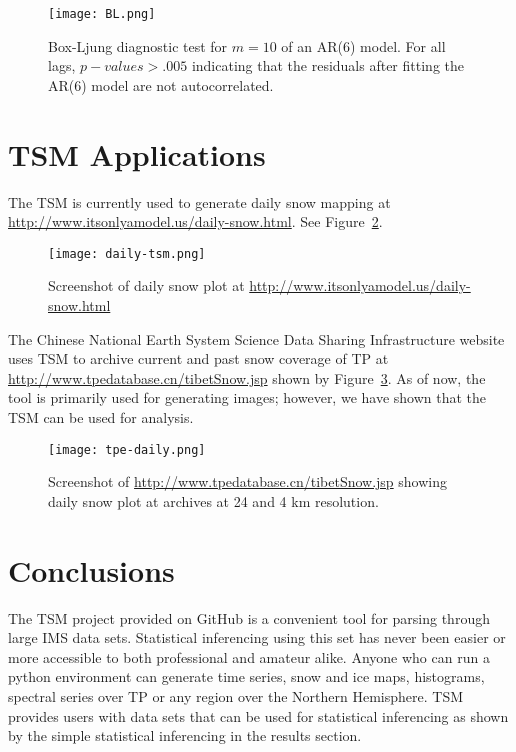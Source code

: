 \begin{figure}[ht]
\centering
\begin{minipage}{3in}
\texttt{[image: BL.png]}
\caption{Box-Ljung diagnostic test for $m=10$ of an AR(6) model. For all lags, $p-values>.005$ indicating that the residuals after fitting the AR(6) model are not autocorrelated.}
\label{fig:BL}
\end{minipage}
\end{figure}

\section{TSM Applications}
The TSM is currently used to generate daily snow mapping at \url{http://www.itsonlyamodel.us/daily-snow.html}. See Figure~\ref{fig:daily_map}.

\begin{figure}[ht]
\centering
\begin{minipage}{4in}
\texttt{[image: daily-tsm.png]}
\caption{Screenshot of daily snow plot at \url{http://www.itsonlyamodel.us/daily-snow.html}}
\label{fig:daily_map}
\end{minipage}
\end{figure}

The Chinese National Earth System Science Data Sharing Infrastructure website uses TSM to archive current and past snow coverage of TP at \url{http://www.tpedatabase.cn/tibetSnow.jsp}\cite{TP_database} shown by Figure~\ref{fig:ch_daily_map}. As of now, the tool is primarily used for generating images; however, we have shown that the TSM can be used for analysis.

\begin{figure}[ht]
\centering
\begin{minipage}{4in}
\texttt{[image: tpe-daily.png]}
\caption{Screenshot of \url{http://www.tpedatabase.cn/tibetSnow.jsp} showing daily snow plot at archives at 24 and 4 km resolution.}
\label{fig:ch_daily_map}
\end{minipage}
\end{figure}

\section{Conclusions}\label{conclusions}

The TSM project provided on GitHub \cite{git_proj} is a convenient tool for parsing through large IMS data sets. Statistical inferencing using this set has never been easier or more accessible to both professional and amateur alike. Anyone who can run a python environment can generate time series, snow and ice maps, histograms, spectral series over TP or any region over the Northern Hemisphere. TSM provides users with data sets that can be used for statistical inferencing as shown by the simple statistical inferencing in the results section.

